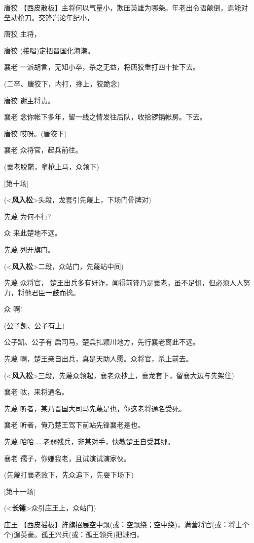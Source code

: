唐狡
【西皮散板】主将何以气量小，欺压英雄为哪条。年老出令语颠倒，焉能对垒动枪刀。交锋岂论年纪小，

唐狡 主将，

唐狡 (接唱)定把晋国化海潮。

襄老 一派胡言，无知小卒，杀之无益，将唐狡重打四十扯下去。

(二卒、唐狡下，内打，搀上，狡跪念)

唐狡 谢主将责。

襄老 念你帐下多年，留一线之情发往后队，收拾锣锅帐房。下去。

唐狡 哎呀。(唐狡下)

襄老 众将官，起兵前往。

(襄老脱氅，拿枪上马，众领下)

{[}第十场{]}

(\textless{}\textbf{风入松}\textgreater{}头段，龙套引先蔑上，下场门骨牌对)

先蔑 为何不行?

众 来此楚地不远。

先蔑 列开旗门。

(\textless{}\textbf{风入松}\textgreater{}二段，众站门，先蔑站中间)

先蔑 众将官，
楚王出兵多有奸诈，闻得前锋乃是襄老，虽不足惧，但必须人人努力，将他君臣一鼓而擒。

众 啊!

(公子凯、公子有上)

公子凯、公子有 启司马，楚兵扎颖川地方，先行襄老离此不远。

先蔑 啊，楚王亲自出兵，真是天助人愿。众将官，杀上前去。

(\textless{}\textbf{风入松}\textgreater{}三段，先蔑众领起，襄老众抄上，襄龙套下，留襄大边与先架住)

襄老 呔，来将通名。

先蔑 听者，某乃晋国大司马先蔑是也，你这老将通名受死。

襄老 听者，俺乃楚王驾下前站先锋襄老是也。

先蔑 哈哈\ldots{}\ldots{}老弱残兵，非某对手，快教楚王自受其绑。

襄老 孺子，你嫌我老，且试演试演家伙。

(先蔑打襄老败下，先众追下，先耍下场下)

{[}第十一场{]}

(\textless{}\textbf{长锤}\textgreater{}众引庄王上，众站门)

庄王
【西皮摇板】旌旗招展空中飘(或：空飘绕；空中绕)，满营将官(或：将士个个)逞英豪。孤王兴兵(或：孤王领兵)把贼扫，

